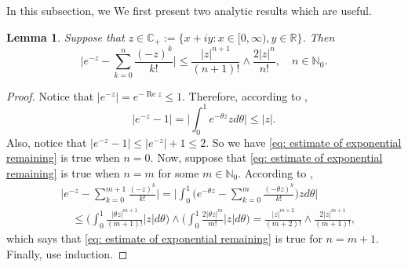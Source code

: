 \documentclass[12pt,oneside,english]{amsart}
\theoremstyle{plain}
\newtheorem{lem}[thm]{Lemma}
\theoremstyle{definition}
\numberwithin{equation}{section}
\newcommand{\added}[1]{{\color{blue}#1}}\newcommand{\deleted}[1]{{\color{red}#1}}
\begin{document}
\subsection{}
    \added{ In this subsection, we }\deleted{ We first} present two analytic results which are useful.
\begin{lem}
\label{lem: estimate of exponential remaining}
    Suppose that $z\in \mathbb C_+:= \{x+iy: x \in [0,\infty), y \in \mathbb R\}$. Then
\begin{equation}
\label{eq: estimate of exponential remaining}
    \Big|e^{-z} - \sum_{k=0}^n \frac{(-z)^k}{k!} \Big|
    \leq \frac{|z|^{n+1}}{(n+1)!} \wedge \frac{2|z|^{n}}{n!}, \quad n\in \mathbb N_0.
\end{equation}
\end{lem}
\begin{proof}
    Notice that $|e^{-z}| = e^{- \operatorname{Re} z} \leq 1$.
    Therefore, according to \cite[Theorem 7.20.]{Rudin1987Real},
\begin{equation}
    |e^{-z} - 1| = \Big| \int_0^1 e^{-\theta z} z d\theta\Big|
    \leq |z|.
\end{equation}
    Also, notice that $|e^{-z} - 1| \leq |e^{-z}|+1 \leq 2$.
    So we have \eqref{eq: estimate of exponential remaining} is true when $n = 0$.
    Now, suppose that \eqref{eq: estimate of exponential remaining} is true when $n = m$ for some $m \in \mathbb N_0$.
    According to \cite[Theorem 7.20.]{Rudin1987Real},
\begin{align}
    &\Big|e^{-z} - \sum_{k=0}^{m+1} \frac{(-z)^k}{k!}\Big|
    = \Big| \int_0^1\Big(e^{-\theta z} - \sum_{k=0}^m \frac{(-\theta z)^k}{k!} \Big) z d\theta \Big|
    \\&\quad \leq  \Big(\int_0^1 \frac{|\theta z|^{m+1}}{(m+1)!} |z| d\theta\Big) \wedge \Big(\int_0^1 \frac{2|\theta z|^{m}}{m!} |z| d\theta\Big)
    = \frac{|z|^{m+2}}{(m+2)!} \wedge \frac{2|z|^{m+1}}{(m+1)!},
\end{align}
    which says that \eqref{eq: estimate of exponential remaining} is true for $n = m + 1$.
    Finally, use induction.
\end{proof}
\end{document}
